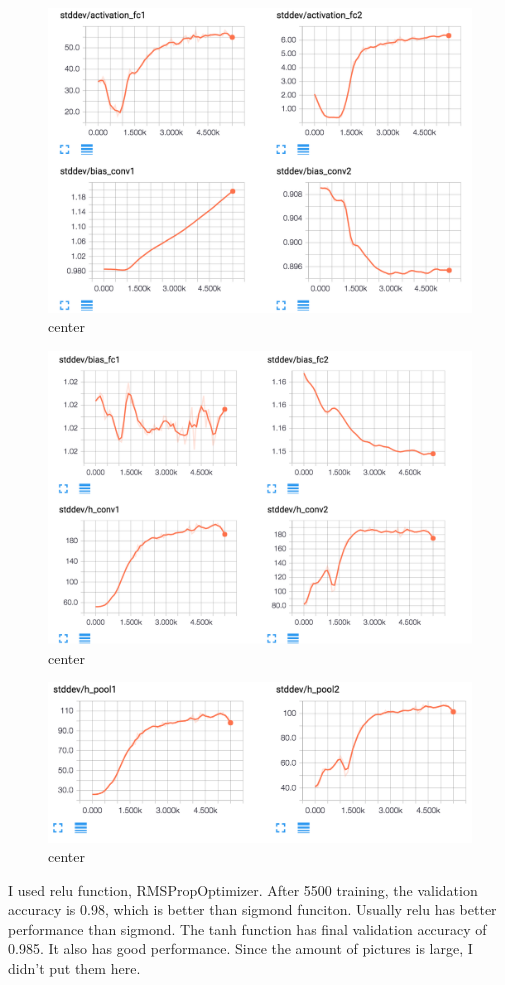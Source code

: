 \documentclass[12pt]{article}
\begin{document}
\begin{figure}[H]
  \caption{center}
  \centering
    \includegraphics[scale=0.3]{st2.png}
\end{figure}
\begin{figure}[H]
  \caption{center}
  \centering
    \includegraphics[scale=0.3]{st3.png}
\end{figure}
\begin{figure}[H]
  \caption{center}
  \centering
    \includegraphics[scale=0.3]{st4.png}
\end{figure}
I used relu function, RMSPropOptimizer. After 5500 training, the validation accuracy is 0.98, which is better than sigmond funciton. Usually relu has better performance than sigmond. 
The tanh function has final validation accuracy of 0.985. It also has good performance. Since the amount of pictures is large, I didn't put them here. 

			
\end{document}
